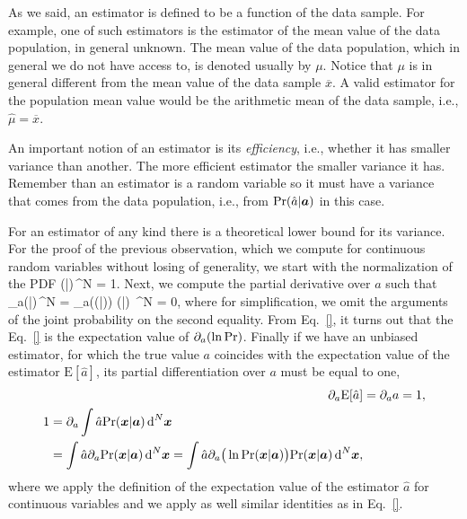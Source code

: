As we said, an estimator is defined to be a function of the data sample.
For example, one of such estimators is the estimator of the mean value of the data population, in general unknown.
The mean value of the data population, which in general we do not have access to, is denoted usually by $\mu$.
Notice that $\mu$ is in general different from the mean value of the data sample $\overline{x}$.
A valid estimator for the population mean value would be the arithmetic mean of the data sample, i.e., $\hat{\mu}=\overline{x}$.

An important notion of an estimator is its \emph{efficiency}, i.e., whether it has smaller variance than another.
The more efficient estimator the smaller variance it has.
Remember than an estimator is a random variable so it must have a variance that comes from the data population, i.e., from $\text{Pr}(\hat{a}|\boldsymbol{a})$ in this case.

For an estimator of any kind there is a theoretical lower bound for its variance.
For the proof of the previous observation, which we compute for continuous random variables without losing of generality, we start with the normalization of the PDF
\be
  \int \prob(|)\,^N = 1.
\ee
Next, we compute the partial derivative over $a$ such that
\be
  \int \partial_a\prob(|)\,^N = \int \partial_a\big(\ln  \prob(|)\big) \prob(|) \,^N = 0,
\ee
where for simplification, we omit the arguments of the joint probability on the second equality.
From Eq.~\eqref{}, it turns out that the Eq.~\eqref{} is the expectation value of $\partial_a(\ln\text{Pr})$.
Finally if we have an unbiased estimator, for which the true value $a$ coincides with the expectation value of the estimator $\text{E}[\hat{a}]$, its partial differentiation over $a$ must be equal to one,
\begin{align}
  \partial_a\text{E}[\hat{a}] &= \partial_a a = 1, \\
  \begin{split}
    1 &= \partial_a \int \hat{a} \text{Pr}(\boldsymbol{x}|\boldsymbol{a})\,\text{d}^N\boldsymbol{x} \\
      &=  \int \hat{a} \partial_a\text{Pr}(\boldsymbol{x}|\boldsymbol{a})\,\text{d}^N\boldsymbol{x} =  \int \hat{a} \partial_a\big(\ln  \text{Pr}(\boldsymbol{x}|\boldsymbol{a})\big) \text{Pr}(\boldsymbol{x}|\boldsymbol{a}) \,\text{d}^N\boldsymbol{x},
  \end{split}
\end{align}
where we apply the definition of the expectation value of the estimator $\hat{a}$ for continuous variables and we apply as well similar identities as in Eq.~\eqref{}.

